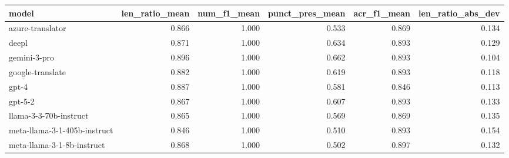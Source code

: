 \begin{tabular}{lrrrrr}
\toprule
model & len\_ratio\_mean & num\_f1\_mean & punct\_pres\_mean & acr\_f1\_mean & len\_ratio\_abs\_dev \\
\midrule
azure-translator & 0.866 & 1.000 & 0.533 & 0.869 & 0.134 \\
deepl & 0.871 & 1.000 & 0.634 & 0.893 & 0.129 \\
gemini-3-pro & 0.896 & 1.000 & 0.662 & 0.893 & 0.104 \\
google-translate & 0.882 & 1.000 & 0.619 & 0.893 & 0.118 \\
gpt-4 & 0.887 & 1.000 & 0.581 & 0.846 & 0.113 \\
gpt-5-2 & 0.867 & 1.000 & 0.607 & 0.893 & 0.133 \\
llama-3-3-70b-instruct & 0.865 & 1.000 & 0.569 & 0.869 & 0.135 \\
meta-llama-3-1-405b-instruct & 0.846 & 1.000 & 0.510 & 0.893 & 0.154 \\
meta-llama-3-1-8b-instruct & 0.868 & 1.000 & 0.502 & 0.897 & 0.132 \\
\bottomrule
\end{tabular}
